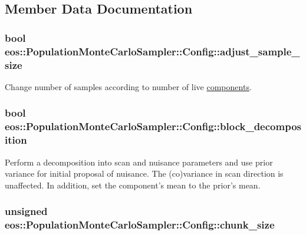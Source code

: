 \subsection{Member Data Documentation}
\hypertarget{structeos_1_1PopulationMonteCarloSampler_1_1Config_af4b575d8f24b51783b11bd5dca5ea576}{
\subsubsection[{adjust\_\-sample\_\-size}]{\setlength{\rightskip}{0pt plus 5cm}bool {\bf eos::PopulationMonteCarloSampler::Config::adjust\_\-sample\_\-size}}}
\label{structeos_1_1PopulationMonteCarloSampler_1_1Config_af4b575d8f24b51783b11bd5dca5ea576}


Change number of samples according to number of live \hyperlink{namespaceeos_1_1components}{components}. \hypertarget{structeos_1_1PopulationMonteCarloSampler_1_1Config_afbe44ab88cfffcf63495463004cdd9b5}{
\subsubsection[{block\_\-decomposition}]{\setlength{\rightskip}{0pt plus 5cm}bool {\bf eos::PopulationMonteCarloSampler::Config::block\_\-decomposition}}}
\label{structeos_1_1PopulationMonteCarloSampler_1_1Config_afbe44ab88cfffcf63495463004cdd9b5}
Perform a decomposition into scan and nuisance parameters and use prior variance for initial proposal of nuisance. The (co)variance in scan direction is unaffected. In addition, set the component's mean to the prior's mean. \hypertarget{structeos_1_1PopulationMonteCarloSampler_1_1Config_ac6d3a2f26905ec51f3e9eadf73d51792}{
\subsubsection[{chunk\_\-size}]{\setlength{\rightskip}{0pt plus 5cm}unsigned {\bf eos::PopulationMonteCarloSampler::Config::chunk\_\-size}}}
\label{structeos_1_1PopulationMonteCarloSampler_1_1Config_ac6d3a2f26905ec51f3e9eadf73d51792}


